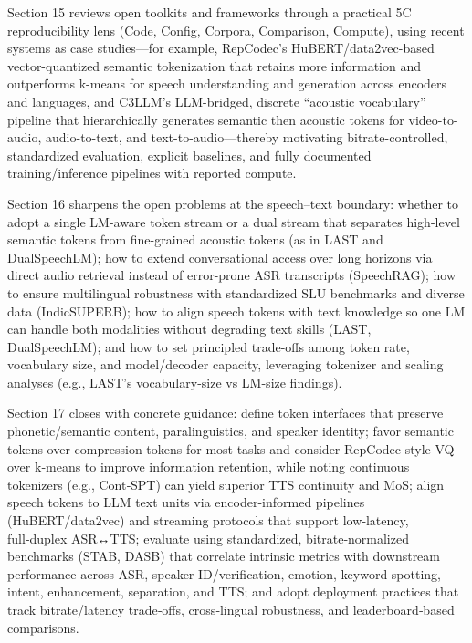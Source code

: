 Section 15 reviews open toolkits and frameworks through a practical 5C reproducibility lens (Code, Config, Corpora, Comparison, Compute), using recent systems as case studies—for example, RepCodec’s HuBERT/data2vec-based vector-quantized semantic tokenization that retains more information and outperforms k-means for speech understanding and generation across encoders and languages, and C3LLM’s LLM-bridged, discrete “acoustic vocabulary” pipeline that hierarchically generates semantic then acoustic tokens for video-to-audio, audio-to-text, and text-to-audio—thereby motivating bitrate-controlled, standardized evaluation, explicit baselines, and fully documented training/inference pipelines with reported compute. \cite{wang2024c3llmconditionalmultimodalcontentgenerat,huang2024repcodecspeechrepresentationcodectokeniz} 



Section 16 sharpens the open problems at the speech–text boundary: whether to adopt a single LM-aware token stream or a dual stream that separates high-level semantic tokens from fine-grained acoustic tokens (as in LAST and DualSpeechLM); how to extend conversational access over long horizons via direct audio retrieval instead of error-prone ASR transcripts (SpeechRAG); how to ensure multilingual robustness with standardized SLU benchmarks and diverse data (IndicSUPERB); how to align speech tokens with text knowledge so one LM can handle both modalities without degrading text skills (LAST, DualSpeechLM); and how to set principled trade-offs among token rate, vocabulary size, and model/decoder capacity, leveraging tokenizer and scaling analyses (e.g., LAST’s vocabulary-size vs LM-size findings). \cite{min2025speechretrievalaugmentedgenerationwithou,turetzky2024lastlanguagemodelawarespeechtokenization,wang2025dualspeechlmtowardsunifiedspeechundersta,entry2025indicsuperbspeechprocessinguniversalperf} 



Section 17 closes with concrete guidance: define token interfaces that preserve phonetic/semantic content, paralinguistics, and speaker identity; favor semantic tokens over compression tokens for most tasks and consider RepCodec-style VQ over k‑means to improve information retention, while noting continuous tokenizers (e.g., Cont‑SPT) can yield superior TTS continuity and MoS; align speech tokens to LLM text units via encoder-informed pipelines (HuBERT/data2vec) and streaming protocols that support low‑latency, full‑duplex ASR↔TTS; evaluate using standardized, bitrate‑normalized benchmarks (STAB, DASB) that correlate intrinsic metrics with downstream performance across ASR, speaker ID/verification, emotion, keyword spotting, intent, enhancement, separation, and TTS; and adopt deployment practices that track bitrate/latency trade‑offs, cross‑lingual robustness, and leaderboard‑based comparisons. \cite{li2025continuousspeechtokenizertext,mousavi2024dasbdiscreteaudiospeechbenchmark,vashishth2024stabspeechtokenizerassessmentbenchmark,huang2024repcodecspeechrepresentationcodectokeniz}




